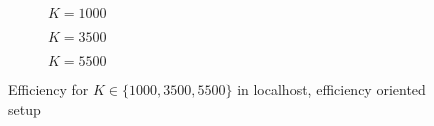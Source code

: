 \begin{figure}[t]
\centering
\begin{subfigure}{0.23\textwidth}
	\captionsetup{justification=centering,font=scriptsize}
	\centering
	\setlength\fwidth{\textwidth}
	\setlength{}
	\caption{$K=1000$}
	\label{fig:lh_eff_1000_eff}
\end{subfigure}\hspace{2em}%
\begin{subfigure}{0.23\textwidth}
	\captionsetup{justification=centering,font=scriptsize}
	\centering
	\setlength\fwidth{\textwidth}
	\setlength{}
	\caption{$K=3500$}
	\label{fig:lh_eff_3500_eff}
\end{subfigure}\hspace{2em}%
\begin{subfigure}{0.23\textwidth}
	\captionsetup{justification=centering,font=scriptsize}
	\centering
	\setlength\fwidth{\textwidth}
	\setlength{}
	\caption{$K=5500$}
	\label{fig:lh_eff_5500_eff}
\end{subfigure}
\caption{Efficiency for $K \in \{1000, 3500, 5500\}$ in localhost, efficiency oriented setup}
\label{fig:eff_nonaggr}
\end{figure}


